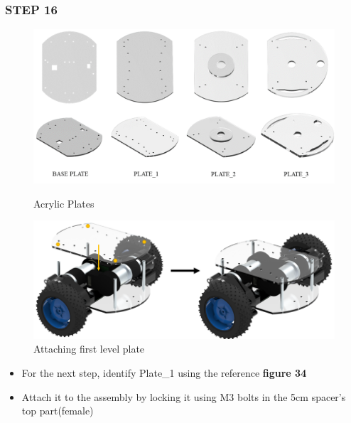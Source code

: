 \documentclass[12pt,a4paper,oneside]{book}
\begin{document}
			\subsubsection*{STEP 16}
				\begin{figure}[H]
					\begin{center}
						\includegraphics[scale=0.4]{PLATES}
						\caption{Acrylic Plates}
						\includegraphics[scale=0.6]{ATTACHING PLATE 1}
						\caption{Attaching first level plate}
					\end{center}
				\end{figure}
				\begin{itemize}
					\item For the next step, identify Plate\_1 using the reference \textbf{figure 34}
					\item Attach it to the assembly by locking it using M3 bolts in the 5cm spacer's top part(female) 
				\end{itemize}
				
\end{document}
